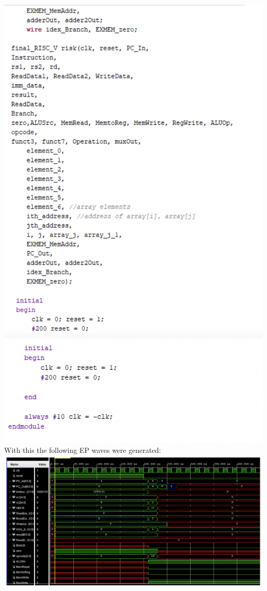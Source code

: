 \documentclass[a4paper, 12pt]{report}
\begin{document}
\\\includegraphics[scale = 0.5]{pipe test 2.png}
\\\includegraphics[scale = 0.5]{pipe test 3.png}
\\With this the following EP waves were generated:
\\\includegraphics[scale = 0.5]{pipe ep 1.png}
\end{document}
